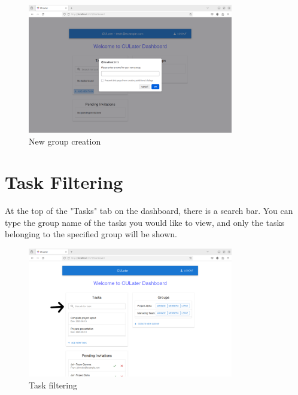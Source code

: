 \documentclass{scrreprt}
\begin{document}
\begin{figure}[htbp]
        \centering
        \includegraphics[width=0.8\textwidth]{task_create_no_group_new_group_creation.png}
	\caption{New group creation}
	\label{fig:my_label}
\end{figure}


\chapter{Task Filtering}

At the top of the "Tasks" tab on the dashboard, there is a search bar. You can type the group name of the tasks you would like to view, and only the tasks belonging to the specified group will be shown.
\begin{figure}[htbp]
        \centering
        \includegraphics[width=0.8\textwidth]{task_filtering.png}
	\caption{Task filtering}
	\label{fig:my_label}
\end{figure}
\end{document}
